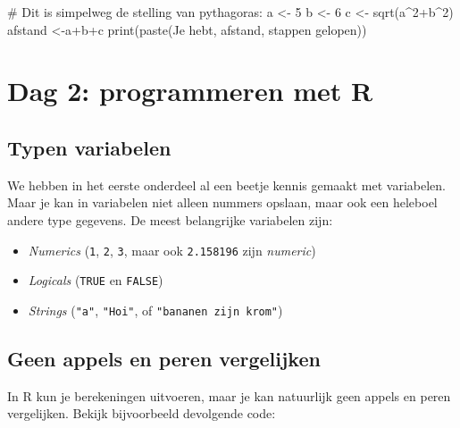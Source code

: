 \documentclass[
  b5paper,
  DIV=11,
  numbers=noendperiod]{scrreprt}
\newenvironment{Shaded}{\begin{snugshade}}{\end{snugshade}}
\newcommand{\CommentTok}[1]{\textcolor[rgb]{0.37,0.37,0.37}{#1}}
\newcommand{\DecValTok}[1]{\textcolor[rgb]{0.68,0.00,0.00}{#1}}
\newcommand{\FunctionTok}[1]{\textcolor[rgb]{0.28,0.35,0.67}{#1}}
\newcommand{\NormalTok}[1]{\textcolor[rgb]{0.00,0.23,0.31}{#1}}
\newcommand{\OtherTok}[1]{\textcolor[rgb]{0.00,0.23,0.31}{#1}}
\newcommand{\SpecialCharTok}[1]{\textcolor[rgb]{0.37,0.37,0.37}{#1}}
\newcommand{\StringTok}[1]{\textcolor[rgb]{0.13,0.47,0.30}{#1}}
\theoremstyle{definition}
\theoremstyle{remark}
\begin{document}
\begin{Shaded}
\begin{Highlighting}[]
\CommentTok{\# Dit is simpelweg de stelling van pythagoras:}
\NormalTok{a }\OtherTok{\textless{}{-}} \DecValTok{5}
\NormalTok{b }\OtherTok{\textless{}{-}} \DecValTok{6}
\NormalTok{c }\OtherTok{\textless{}{-}} \FunctionTok{sqrt}\NormalTok{(a}\SpecialCharTok{\^{}}\DecValTok{2}\SpecialCharTok{+}\NormalTok{b}\SpecialCharTok{\^{}}\DecValTok{2}\NormalTok{)}
\NormalTok{afstand }\OtherTok{\textless{}{-}}\NormalTok{a}\SpecialCharTok{+}\NormalTok{b}\SpecialCharTok{+}\NormalTok{c}
\FunctionTok{print}\NormalTok{(}\FunctionTok{paste}\NormalTok{(}\StringTok{\textquotesingle{}Je hebt\textquotesingle{}}\NormalTok{, afstand, }\StringTok{\textquotesingle{}stappen gelopen\textquotesingle{}}\NormalTok{))}
\end{Highlighting}
\end{Shaded}

\chapter{Dag 2: programmeren met R}\label{dag-2-programmeren-met-r}

\section{Typen variabelen}\label{typen-variabelen}

We hebben in het eerste onderdeel al een beetje kennis gemaakt met
variabelen. Maar je kan in variabelen niet alleen nummers opslaan, maar
ook een heleboel andere type gegevens. De meest belangrijke variabelen
zijn:

\begin{itemize}
\item
  \emph{Numerics} (\texttt{1}, \texttt{2}, \texttt{3}, maar ook
  \texttt{2.158196} zijn \emph{numeric})
\item
  \emph{Logicals} (\texttt{TRUE} en \texttt{FALSE})
\item
  \emph{Strings} (\texttt{"a"}, \texttt{"Hoi"}, of
  \texttt{"bananen\ zijn\ krom"})
\end{itemize}

\section{Geen appels en peren
vergelijken}\label{geen-appels-en-peren-vergelijken}

In R kun je berekeningen uitvoeren, maar je kan natuurlijk geen appels
en peren vergelijken. Bekijk bijvoorbeeld devolgende code:
\end{document}
